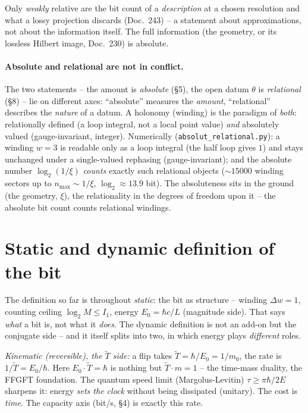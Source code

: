 Only \emph{weakly} relative are the bit count of a \emph{description} at a chosen resolution and what a
lossy projection discards (Doc.~243) -- a statement about approximations, not about the information
itself. The full information (the geometry, or its lossless Hilbert image, Doc.~230) is absolute.

\paragraph{Absolute and relational are not in conflict.} The two statements -- the amount is
\emph{absolute} (§5), the open datum $\theta$ is \emph{relational} (§8) -- lie on different axes:
\enquote{absolute} measures the \emph{amount}, \enquote{relational} describes the \emph{nature} of a
datum. A holonomy (winding) is the paradigm of \emph{both}: relationally defined (a loop integral, not a
local point value) \emph{and} absolutely valued (gauge-invariant, integer). Numerically
(\texttt{absolut\_relational.py}): a winding $w=3$ is readable only as a loop integral (the half loop
gives $1$) and stays unchanged under a single-valued rephasing (gauge-invariant); and the absolute number
$\log_2(1/\xi)$ \emph{counts} exactly such relational objects ($\sim15000$ winding sectors up to
$n_\text{max}\sim1/\xi$, $\log_2\approx13.9$ bit). The absoluteness sits in the ground (the geometry,
$\xi$), the relationality in the degrees of freedom upon it -- the absolute bit count counts relational
windings.

\section{Static and dynamic definition of the bit}
The definition so far is throughout \emph{static}: the bit as structure -- winding $\Delta w=1$, counting
ceiling $\log_2 M\le I_1$, energy $E_0=\hbar c/L$ (magnitude side). That says \emph{what} a bit is, not
what it \emph{does}. The dynamic definition is not an add-on but the conjugate side -- and it itself splits
into two, in which energy plays \emph{different} roles.

\emph{Kinematic (reversible), the $\tilde T$ side:} a flip takes $\tilde T=\hbar/E_0=1/m_0$, the rate is
$1/\tilde T=E_0/\hbar$. Here $E_0\cdot\tilde T=\hbar$ is nothing but $\tilde T\cdot m=1$ -- the time-mass
duality, the FFGFT foundation. The quantum speed limit (Margolus-Levitin) $\tau\ge\pi\hbar/2E$ sharpens it:
energy \emph{sets the clock} without being dissipated (unitary). The cost is \emph{time}. The capacity axis
(bit/s, §4) is exactly this rate.

